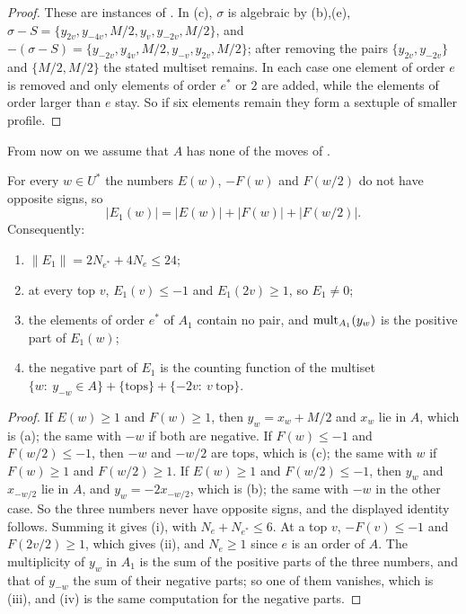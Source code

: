 \begin{proof}
These are instances of . In (c), $\sigma$ is algebraic by
(b),(e), $\sigma-S=\{y_{2v},y_{-4v},M/2,y_{v},y_{-2v},
M/2\}$, and $-(\sigma-S)=\{y_{-2v},y_{4v},M/2,y_{-v},y_{2v},M/2\}$; after
removing the pairs $\{y_{2v},y_{-2v}\}$ and $\{M/2,M/2\}$ the stated multiset
remains. In each case one element of order
$e$ is removed and only elements of order $e^{*}$ or $2$ are added, while the
elements of order larger than $e$ stay. So if six elements remain they form a
sextuple of smaller profile.
\end{proof}

From now on we assume that $A$ has none of the moves of
.

\begin{lemma}\label{lem:signs}
For every $w\in U^{*}$ the numbers $E(w)$, $-F(w)$ and $F(w/2)$ do not have
opposite signs, so
\[
  |E_{1}(w)|=|E(w)|+|F(w)|+|F(w/2)|.
\]
Consequently:
\begin{enumerate}[label=\textup{(\roman*)}]
\item $\|E_{1}\|=2N_{e^{*}}+4N_{e}\le24$;
\item at every top $v$, $E_{1}(v)\le-1$ and $E_{1}(2v)\ge1$, so $E_{1}\ne0$;
\item the elements of order $e^{*}$ of $A_{1}$ contain no pair, and
$\operatorname{mult}_{A_{1}}(y_{w})$ is the positive part of $E_{1}(w)$;
\item the negative part of $E_{1}$ is the counting function of the multiset
$\{w:\ y_{-w}\in A\}+\{\text{tops}\}+\{-2v:\ v\ \text{top}\}$.
\end{enumerate}
\end{lemma}

\begin{proof}
If $E(w)\ge1$ and $F(w)\ge1$, then $y_{w}=x_{w}+M/2$ and $x_{w}$ lie in
$A$, which is (a); the same with $-w$ if both are
negative. If $F(w)\le-1$ and $F(w/2)\le-1$, then $-w$ and $-w/2$ are tops,
which is (c); the same with $w$ if $F(w)\ge1$ and $F(w/2)\ge1$. If
$E(w)\ge1$ and $F(w/2)\le-1$, then $y_{w}$ and $x_{-w/2}$ lie in $A$, and
$y_{w}=-2x_{-w/2}$, which is (b); the same with $-w$ in the other case. So
the three numbers never have opposite signs, and the displayed identity
follows. Summing it gives (i), with $N_{e}+N_{e^{*}}\le6$. At a top $v$,
$-F(v)\le-1$ and $F(2v/2)\ge1$, which gives (ii), and $N_{e}\ge1$ since $e$
is an order of $A$. The multiplicity of $y_{w}$ in $A_{1}$ is the sum of the
positive parts of the three numbers, and that of $y_{-w}$ the sum of their
negative parts; so one of them vanishes, which is (iii), and (iv) is the
same computation for the negative parts.
\end{proof}

